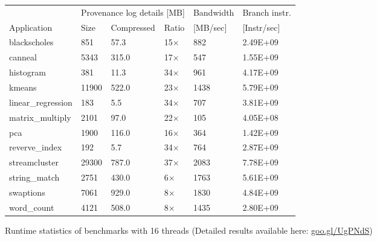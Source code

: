 \begin{figure}[t]
\centering
\myfontsize
{
\begin{tabular}{m{1.4cm}|m{.6cm}|m{1.2cm}|m{0.8cm}|m{1.25cm}|m{1.25cm}}
       & \multicolumn{3}{c|}{ Provenance log details [MB] }   &  Bandwidth & Branch instr. \\
   { Application} & Size & Compressed & Ratio & [MB/sec] &  [Instr/sec] \\
  \hline \hline
    blackscholes & 851& 57.3 & 15$\times$& 882& 2.49E+09 \\
    canneal& 5343& 315.0 &  17$\times$& 547& 1.55E+09 \\
    histogram& 381& 11.3 & 34$\times$& 961& 4.17E+09 \\
    kmeans& 11900& 522.0 & 23$\times$& 1438& 5.79E+09 \\
    linear\_regression& 183& 5.5 & 34$\times$& 707& 3.81E+09 \\
    matrix\_multiply& 2101& 97.0 & 22$\times$& 105& 4.05E+08 \\
    pca& 1900& 116.0 & 16$\times$& 364& 1.42E+09 \\
    reverve\_index& 192& 5.7 & 34$\times$& 764& 2.87E+09 \\
    streamcluster& 29300& 787.0 & 37$\times$& 2083& 7.78E+09 \\
    string\_match& 2751& 430.0 & 6$\times$& 1763& 5.61E+09 \\
    swaptions& 7061& 929.0 & 8$\times$& 1830& 4.84E+09 \\
    word\_count& 4121& 508.0 & 8$\times$& 1435& 2.80E+09 \\

\hline
\end{tabular}
}

\caption{Runtime statistics of benchmarks with 16 threads (Detailed results available here: \href{https://goo.gl/UgPNdS}{goo.gl/UgPNdS}) }                                                                                                                                      \label{tab:apps}
\end{figure}
